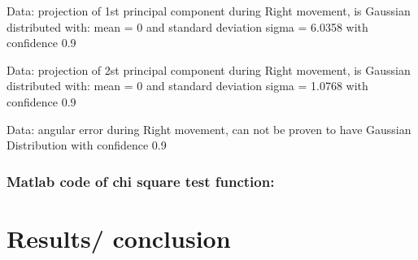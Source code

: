 \documentclass[a4paper, 12pt]{article}
\begin{document}
Data: projection of 1st principal component during  Right movement, is Gaussian distributed with: mean = 0 and standard deviation sigma = 6.0358 with confidence 0.9%






\smallskip

Data: projection of 2st principal component during  Right movement, is Gaussian distributed with: mean = 0 and standard deviation sigma = 1.0768 with confidence 0.9%






\smallskip


Data:  angular error during   Right movement, can not be proven to have Gaussian Distribution with confidence 0.9%

\newpage

\subsubsection{Matlab code of chi square test function:}



\section{Results/ conclusion}
\end{document}
